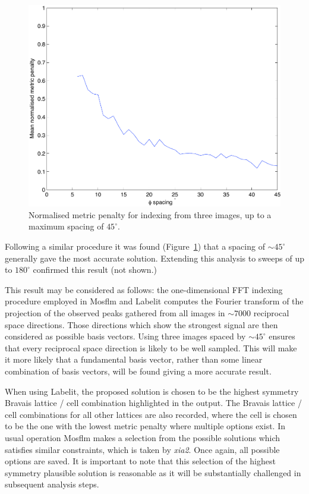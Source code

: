 \documentclass[preprint,pdf]{iucr}
\begin{document}
\begin{figure}
\caption{Normalised metric penalty for indexing from three images, up
  to a maximum spacing of $45^{\circ}$.
\label{figure:phi_spacing_45a}}
\centering
\includegraphics[scale=0.5]{figures/phi_spacing_45a.pdf}
\end{figure}

Following a similar procedure it was found
(Figure~\ref{figure:phi_spacing_45a}) that a 
spacing of $\sim 45^{\circ}$ generally gave the most accurate
solution. Extending this analysis to sweeps of up to $180^{\circ}$
confirmed this result (not shown.) 

This result may be considered as follows: the one-dimensional FFT
indexing procedure employed in Mosflm and Labelit computes the
Fourier transform of the projection of the observed peaks gathered
from all images in $\sim
7000$ reciprocal space directions. Those directions which show the
strongest signal are then considered as possible basis vectors. Using
three images spaced by $\sim 45^{\circ}$ ensures that every reciprocal
space direction is likely to be well sampled. This will make it more likely
that a fundamental basis vector, rather than some linear combination
of basis vectors, will be found giving a more accurate result.

When using Labelit, the proposed solution is chosen to be the highest symmetry
Bravais lattice / cell combination highlighted in the output. The
Bravais lattice / cell combinations for all other lattices are also
recorded, where the cell is chosen to be the one with the lowest
metric penalty where multiple options exist. In usual operation Mosflm
makes a selection from the possible solutions which satisfies similar
constraints, which is taken by \emph{xia2}. Once again, all possible
options are saved. It is important to note that this selection of the
highest symmetry plausible solution is reasonable as it will be
substantially challenged in subsequent analysis steps.
\end{document}
